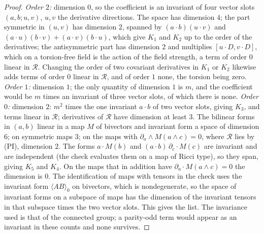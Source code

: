 \begin{proof}
\emph{Order $2$:} dimension $0$, so the coefficient is an invariant of four vector slots $(a, b; u, v)$, $u, v$ the derivative directions. The space has dimension $4$; the part symmetric in $(u, v)$ has dimension $2$, spanned by $(a\cdot b)(u\cdot v)$ and $(a\cdot u)(b\cdot v) + (a\cdot v)(b\cdot u)$, which give $K_{1}$ and $K_{2}$ up to the order of the derivatives; the antisymmetric part has dimension $2$ and multiplies $[u\cdot D, v\cdot D]$, which on a torsion-free field is the action of the field strength, a term of order $0$ linear in $\mathcal{R}$. Changing the order of two covariant derivatives in $K_{1}$ or $K_{2}$ likewise adds terms of order $0$ linear in $\mathcal{R}$, and of order $1$ none, the torsion being zero. \emph{Order $1$:} dimension $1$; the only quantity of dimension $1$ is $m$, and the coefficient would be $m$ times an invariant of three vector slots, of which there is none. \emph{Order $0$:} dimension $2$: $m^{2}$ times the one invariant $a\cdot b$ of two vector slots, giving $K_{3}$, and terms linear in $\mathcal{R}$; derivatives of $\mathcal{R}$ have dimension at least $3$. The bilinear forms in $(a, b)$ linear in a map $M$ of bivectors and invariant form a space of dimension $6$; on symmetric maps $3$; on the maps with $\partial_{a}\wedge M(a\wedge c) = 0$, where $\mathcal{R}$ lies by (PI), dimension $2$. The forms $a\cdot M(b)$ and $(a\cdot b)\,\partial_{c}\cdot M(c)$ are invariant and are independent (the check evaluates them on a map of Ricci type), so they span, giving $K_{5}$ and $K_{4}$. On the maps that in addition have $\partial_{a}\cdot M(a\wedge c) = 0$ the dimension is $0$. The identification of maps with tensors in the check uses the invariant form $\langle AB\rangle_{0}$ on bivectors, which is nondegenerate, so the space of invariant forms on a subspace of maps has the dimension of the invariant tensors in that subspace times the two vector slots. This gives the list. The invariance used is that of the connected group; a parity-odd term would appear as an invariant in these counts and none survives.


\end{proof}
